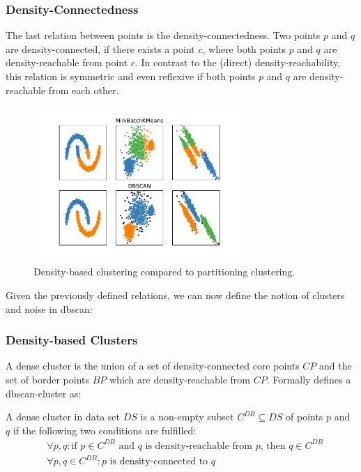 \subsubsection*{Density-Connectedness}
The last relation between points is the density-connectedness. Two points $p$ and $q$ are density-connected, if there exists a point $c$, where both points $p$ and $q$ are density-reachable from point $c$. In contrast to the (direct) density-reachability, this relation is symmetric and even reflexive if both points $p$ and $q$ are density-reachable from each other. 
\begin{figure}
    \centering
    \includegraphics[width=0.7\textwidth]{figures/KMeansVSDBSCAN.pdf}
    \caption{Density-based clustering compared to partitioning clustering.}
    \label{fig:kmeansdbscan}
\end{figure}

\vspace{5mm}

Given the previously defined relations, we can now define the notion of clusters and noise in \gls{dbscan}:

\subsubsection*{Density-based Clusters}
A dense cluster is the union of a set of density-connected core points $CP$ and the set of border points $BP$ which are density-reachable from $CP$.
Formally \citeauthor{DBSCANEKSX96} defines a \gls{dbscan}-cluster as:

A dense cluster in data set $DS$ is a non-empty subset $C^{DB} \subseteq DS$ of points $p$ and $q$ if the following two conditions are fulfilled:
\begin{align}
    &\forall p, q: \text{if } p \in C^{DB} \text{ and } q \text{ is density-reachable from } p \text{, then } q \in C^{DB} \\
    &\forall p, q \in C^{DB}: p \text{ is density-connected to }q
\end{align}

